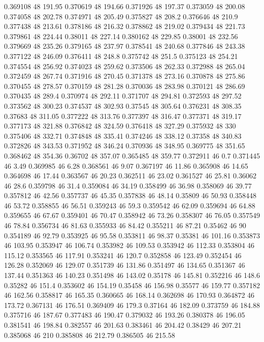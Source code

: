 0.369108 48 191.95
0.370619 48 194.66
0.371926 48 197.37
0.373059 48 200.08
0.374058 48 202.78
0.374971 48 205.49
0.375827 48 208.2
0.376646 48 210.9
0.377438 48 213.61
0.378186 48 216.32
0.378862 48 219.02
0.379434 48 221.73
0.379861 48 224.44
0.38011 48 227.14
0.380162 48 229.85
0.38001 48 232.56
0.379669 48 235.26
0.379165 48 237.97
0.378541 48 240.68
0.377846 48 243.38
0.377122 48 246.09
0.376411 48 248.8
0.375742 48 251.5
0.375123 48 254.21
0.374554 48 256.92
0.374023 48 259.62
0.373506 48 262.33
0.372988 48 265.04
0.372459 48 267.74
0.371916 48 270.45
0.371378 48 273.16
0.370878 48 275.86
0.370455 48 278.57
0.370159 48 281.28
0.370036 48 283.98
0.370121 48 286.69
0.370435 48 289.4
0.370974 48 292.11
0.371707 48 294.81
0.372593 48 297.52
0.373562 48 300.23
0.374537 48 302.93
0.37545 48 305.64
0.376231 48 308.35
0.37683 48 311.05
0.377222 48 313.76
0.377397 48 316.47
0.377371 48 319.17
0.377173 48 321.88
0.376842 48 324.59
0.376418 48 327.29
0.375932 48 330
0.375406 48 332.71
0.374848 48 335.41
0.374246 48 338.12
0.37358 48 340.83
0.372826 48 343.53
0.371952 48 346.24
0.370936 48 348.95
0.369775 48 351.65
0.368462 48 354.36
0.36702 48 357.07
0.365485 48 359.77
0.372911 46 0.7
0.371445 46 3.49
0.369985 46 6.28
0.368561 46 9.07
0.367197 46 11.86
0.365908 46 14.65
0.364698 46 17.44
0.363567 46 20.23
0.362511 46 23.02
0.361527 46 25.81
0.36062 46 28.6
0.359798 46 31.4
0.359084 46 34.19
0.358499 46 36.98
0.358069 46 39.77
0.357812 46 42.56
0.357737 46 45.35
0.357838 46 48.14
0.35809 46 50.93
0.358448 46 53.72
0.358855 46 56.51
0.359243 46 59.3
0.359542 46 62.09
0.359694 46 64.88
0.359655 46 67.67
0.359401 46 70.47
0.358942 46 73.26
0.358307 46 76.05
0.357549 46 78.84
0.356734 46 81.63
0.355933 46 84.42
0.355211 46 87.21
0.35462 46 90
0.354189 46 92.79
0.353925 46 95.58
0.353811 46 98.37
0.35381 46 101.16
0.353873 46 103.95
0.353947 46 106.74
0.353982 46 109.53
0.353942 46 112.33
0.353804 46 115.12
0.353565 46 117.91
0.353241 46 120.7
0.352858 46 123.49
0.352454 46 126.28
0.352069 46 129.07
0.351739 46 131.86
0.351497 46 134.65
0.351367 46 137.44
0.351363 46 140.23
0.351498 46 143.02
0.35178 46 145.81
0.352216 46 148.6
0.35282 46 151.4
0.353602 46 154.19
0.35458 46 156.98
0.35577 46 159.77
0.357182 46 162.56
0.358817 46 165.35
0.360665 46 168.14
0.362698 46 170.93
0.364872 46 173.72
0.367131 46 176.51
0.369409 46 179.3
0.37164 46 182.09
0.373759 46 184.88
0.375716 46 187.67
0.377483 46 190.47
0.379032 46 193.26
0.380378 46 196.05
0.381541 46 198.84
0.382557 46 201.63
0.383461 46 204.42
0.38429 46 207.21
0.385068 46 210
0.385808 46 212.79
0.386505 46 215.58
